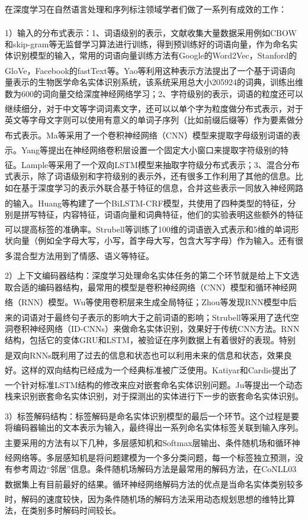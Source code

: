 \documentclass[winfonts,master,oneside,nobackinfo]{njuthesis}
\newcommand{\upcite}[1]{\textsuperscript{\textsuperscript{\cite{#1}}}}
\begin{document}
在深度学习在自然语言处理和序列标注领域学者们做了一系列有成效的工作：

1）输入的分布式表示：1、词语级别的表示，文献\upcite{Nguyen}收集大量数据采用例如CBOW和skip-gram等无监督学习算法进行训练，得到预训练好的词语向量，作为命名实体识别模型的输入，常用的词语向量训练方法有Google的Word2Vec，Stanford的GloVe，Facebook的fastText等。Yao等\upcite{Yao}利用这种表示方法提出了一个基于词语向量表示的生物医学命名实体识别系统，该系统采用总大小205924的词典，训练出维数为600的词向量交给深度神经网络学习；2、字符级别的表示，词语的粒度还可以继续细分\upcite{Kuru}，对于中文等字词词素文字，还可以以单个字为粒度做分布式表示，对于英文等字母文字则可以使用有意义的单词子序列（比如前缀后缀等）作为要素做分布式表示。Ma等\upcite{Ma}采用了一个卷积神经网络（CNN）模型来提取字母级别词语的表示。Yang等\upcite{Yang}提出在神经网络卷积层设置一个固定大小窗口来提取字符级别的特征。Lample等\upcite{Lample}采用了一个双向LSTM模型来抽取字符级分布式表示；3、混合分布式表示，除了词语级别和字符级别的表示外，还有很多工作利用了其他的信息。比如在基于深度学习的表示外联合基于特征的信息，合并这些表示一同放入神经网路的输入。Huang等\upcite{Huang}构建了一个BiLSTM-CRF模型，共使用了四种类型的特征，分别是拼写特征，内容特征，词语向量和词典特征，他们的实验表明这些额外的特征可以提高标签的准确率。Strubell等\upcite{Strubell}训练了100维的词语嵌入式表示和5维的单词形状向量（例如全字母大写，小写，首字母大写，包含大写字母）作为输入。还有很多混合型方法用到了情感、语义\upcite{Jansson}等特征。

2）上下文编码器结构：深度学习处理命名实体任务的第二个环节就是给上下文选取合适的编码器结构，最常用的模型是卷积神经网络（CNN）模型和循环神经网络（RNN）模型。Wu等\upcite{Wu}使用卷积层来生成全局特征；Zhou等\upcite{zhou}发现RNN模型中后来的词语对于最终句子表示的影响大于之前词语的影响；Strubell等\upcite{Strubell}采用了迭代空洞卷积神经网络（ID-CNNs）来做命名实体识别，效果好于传统CNN方法。RNN结构，包括它的变体GRU和LSTM，被验证在序列数据上有着很好的表现。特别是双向RNNs\upcite{Huang}既利用了过去的信息和状态也可以利用未来的信息和状态，效果良好。这样的双向结构已经成为一个经典标准被广泛使用。Katiyar和Cardie\upcite{Katiyar}提出了一个针对标准LSTM结构的修改来应对嵌套命名实体识别问题。Ju等\upcite{Ju}提出一个动态栈来识别嵌套命名实体识别，对于探测出的实体进行下一步的嵌套命名实体识别。

3）标签解码结构：标签解码是命名实体识别模型的最后一个环节。这个过程是要将编码器输出的文本表示为输入，最终得出一系列命名实体标签关联到输入序列。主要采用的方法有以下几种，多层感知机和Softmax层输出\upcite{Strubell}、条件随机场\upcite{Huang}和循环神经网络\upcite{Shen}等。多层感知机是将问题建模为一个多分类问题，每一个标签独立预测，没有参考周边“邻居”信息。条件随机场解码方法是最常用的解码方法，在CoNLL03数据集上有目前最好的结果\upcite{Akbik}。循环神经网络解码方法的优点是当命名实体类别较多时，解码的速度较快\upcite{Shen}，因为条件随机场的解码方法采用动态规划思想的维特比算法，在类别多时解码时间较长。
\end{document}
